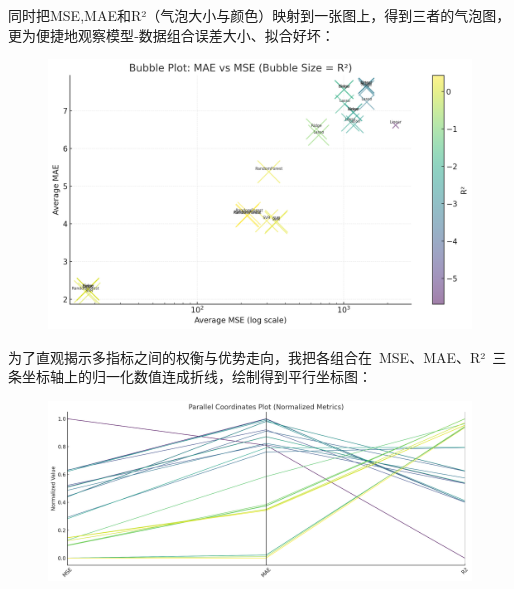 \documentclass[10pt]{article}
\begin{document}
同时把MSE,MAE和R²（气泡大小与颜色）映射到一张图上，得到三者的气泡图，更为便捷地观察模型‑数据组合误差大小、拟合好坏：
\begin{figure}[H]
  \centering
  \includegraphics[width=0.8\linewidth]{bubble_plot.png}
  \label{fig:8}
\end{figure}
为了直观揭示多指标之间的权衡与优势走向，我把各组合在 MSE、MAE、R² 三条坐标轴上的归一化数值连成折线，绘制得到平行坐标图：
\begin{figure}[H]
  \centering
  \includegraphics[width=0.8\linewidth]{parral.png}
  \label{fig:9}
\end{figure}
\end{document}

